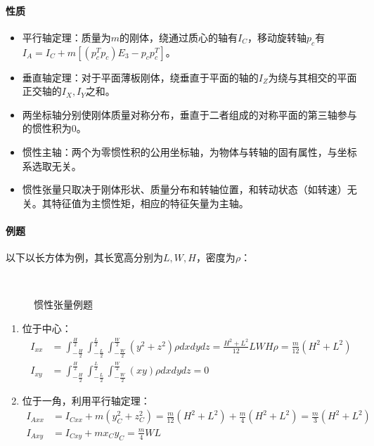 \documentclass[
12pt, %
a4paper, 
oneside, %
headinclude,footinclude, %
]{scrartcl}
\begin{document}
\paragraph{性质}
\begin{itemize}
\item 平行轴定理：质量为$ m $的刚体，绕通过质心的轴有$ I_C $，移动旋转轴$ p_c $有\\$ I_A = I_C + m[(p_c^T p_c)E_3 - p_c p_c^T] $。
\item 垂直轴定理：对于平面薄板刚体，绕垂直于平面的轴的$ I_Z $为绕与其相交的平面正交轴的$ I_X, I_Y $之和。
\item 两坐标轴分别使刚体质量对称分布，垂直于二者组成的对称平面的第三轴参与的惯性积为$ 0 $。
\item 惯性主轴：两个为零惯性积的公用坐标轴，为物体与转轴的固有属性，与坐标系选取无关。
\item 惯性张量只取决于刚体形状、质量分布和转轴位置，和转动状态（如转速）无关。其特征值为主惯性矩，相应的特征矢量为主轴。
\end{itemize}
\paragraph{例题}
{\footnotesize
以下以长方体为例，其长宽高分别为$ L, W, H $，密度为$ \rho $： \\
\begin{minipage}{0.25\textwidth}
\begin{figure}[H]
\centering
\subfloat[位于中心]{\texttt{[image: 6.1]}} \\
\subfloat[位于一角]{\texttt{[image: 6.2]}}
\caption{惯性张量例题}
\end{figure}
\end{minipage}
\begin{minipage}{0.75\textwidth}
\begin{enumerate}
\item 位于中心：
\begin{align*}
I_{xx} &= \int_{-\frac{H}{2}}^{\frac{H}{2}} \int_{-\frac{L}{2}}^{\frac{L}{2}} \int_{-\frac{W}{2}}^{\frac{W}{2}}(y^2 + z^2)\rho dxdydz = \frac{H^2 + L^2}{12} LWH\rho = \frac{m}{12}(H^2 + L^2) \\
I_{xy} &= \int_{-\frac{H}{2}}^{\frac{H}{2}} \int_{-\frac{L}{2}}^{\frac{L}{2}} \int_{-\frac{W}{2}}^{\frac{W}{2}}(xy)\rho dxdydz = 0
\end{align*}
\item 位于一角，利用平行轴定理：
\begin{align*}
I_{Axx} &= I_{Cxx} + m(y_C^2 + z_C^2) = \frac{m}{12}(H^2 + L^2) + \frac{m}{4}(H^2 + L^2) = \frac{m}{3}(H^2 + L^2) \\
I_{Axy} &= I_{Cxy} + m x_C y_C = \frac{m}{4}WL
\end{align*}
\end{enumerate}
\end{minipage}
}
\end{document}

